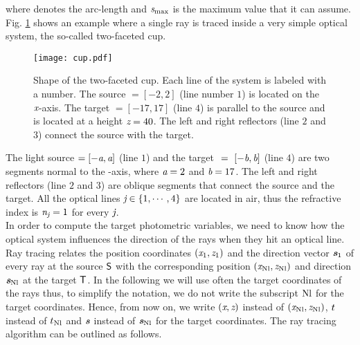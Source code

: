 where  denotes the arc-length and $\textit{s}_{\textrm{max}}$ is the maximum value that it can assume.
Fig. \ref{fig:cup} shows an example where a single ray is traced inside a very simple optical system, the so-called two-faceted cup.
\begin{figure}[h]
\label{fig:cup}
  \begin{center}
\vspace{-1.5cm}
  \texttt{[image: cup.pdf]}
  \end{center}
\vspace{-2cm}
  \caption{\footnotesize{Shape of the two-faceted cup.  Each line of the system is labeled with a number.
   The source $= [-2,2]$ (line number $1$) is located on the $\textit{x}$-axis.
   The target $= [-17, 17]$ (line $4$) is parallel to the source and is located at a height $\textit{z}= 40$.
   The left and right reflectors (line $2$ and $3$) connect the source with the target.}}
  \label{fig:cup}
\end{figure}
The light source $= [-\textit{a}, \textit{a}]$ (line $1$) and the target $~=~ [-\textit{b}, \textit{b}]$ (line $4$) are two segments normal to the -axis, where $\textit{a}=2$ and $\textit{b}=17$.
The left and right reflectors (line $2$ and $3$) are oblique segments that connect the source and the target.
All the optical lines $\textit{j} \in \{1, \cdots, 4\}$  are located in air, thus the refractive index is $\textit{n}_{\textit{j}}=1$ for every $\textit{j}$. \\ \indent
In order to compute the target photometric variables, we need to know how the optical system influences the direction of the rays when they hit an optical line.
Ray tracing relates the position coordinates
 $ (\textit{x}_1, \textit{z}_1)$ and the direction vector $\textit{\textbf{s}}_1$ of every ray at the source $\textsf{S}$ with the corresponding position $(\textit{x}_{\textrm{Nl}}, \textit{z}_{\textrm{Nl}})$ and direction $\textit{\textbf{s}}_{\textrm{Nl}}$
 at the target $\textsf{T}$. In the following we will use often the target coordinates of the rays thus, to simplify the notation, we do not write the subscript $\textrm{Nl}$ for the target coordinates. Hence, from now on, we write $(\textit{x},\textit{z})$ instead of $(\textit{x}_{\textrm{Nl}}, \textit{z}_{\textrm{Nl}})$,  $t$ instead of $t_{\textrm{Nl}}$ and $\textit{\textbf{s}}$ instead of $\textit{\textbf{s}}_{\textrm{Nl}}$ for the target coordinates.
The ray tracing algorithm can be outlined as follows.
